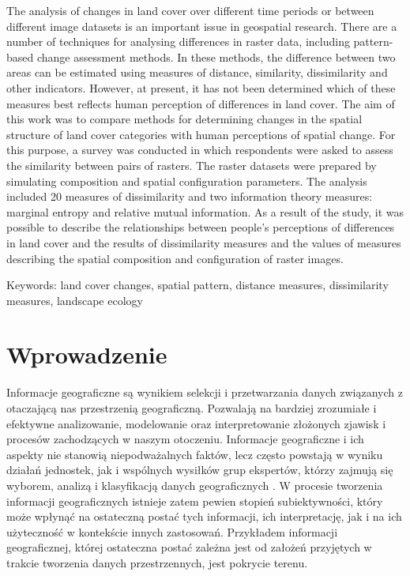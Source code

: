 \documentclass{amuthesis}
\begin{document}
The analysis of changes in land cover over different time periods or
between different image datasets is an important issue in geospatial
research. There are a number of techniques for analysing differences in
raster data, including pattern-based change assessment methods. In these
methods, the difference between two areas can be estimated using
measures of distance, similarity, dissimilarity and other indicators.
However, at present, it has not been determined which of these measures
best reflects human perception of differences in land cover. The aim of
this work was to compare methods for determining changes in the spatial
structure of land cover categories with human perceptions of spatial
change. For this purpose, a survey was conducted in which respondents
were asked to assess the similarity between pairs of rasters. The raster
datasets were prepared by simulating composition and spatial
configuration parameters. The analysis included 20 measures of
dissimilarity and two information theory measures: marginal entropy and
relative mutual information. As a result of the study, it was possible
to describe the relationships between people's perceptions of
differences in land cover and the results of dissimilarity measures and
the values of measures describing the spatial composition and
configuration of raster images.

Keywords: land cover changes, spatial pattern, distance measures,
dissimilarity measures, landscape ecology

\newpage

\sf\tighttoc\doublespacing


\hypertarget{sec-wprowadzenie}{%
\chapter{Wprowadzenie}\label{sec-wprowadzenie}}

Informacje geograficzne są wynikiem selekcji i przetwarzania danych
związanych z otaczającą nas przestrzenią geograficzną. Pozwalają na
bardziej zrozumiałe i efektywne analizowanie, modelowanie oraz
interpretowanie złożonych zjawisk i procesów zachodzących w naszym
otoczeniu. Informacje geograficzne i ich aspekty nie stanowią
niepodważalnych faktów, lecz często powstają w wyniku działań jednostek,
jak i wspólnych wysiłków grup ekspertów, którzy zajmują się wyborem,
analizą i klasyfikacją danych geograficznych \autocite{WhatIsLandCover}.
W procesie tworzenia informacji geograficznych istnieje zatem pewien
stopień subiektywności, który może wpłynąć na ostateczną postać tych
informacji, ich interpretację, jak i na ich użyteczność w kontekście
innych zastosowań. Przykładem informacji geograficznej, której
ostateczna postać zależna jest od założeń przyjętych w trakcie tworzenia
danych przestrzennych, jest pokrycie terenu.
\end{document}
